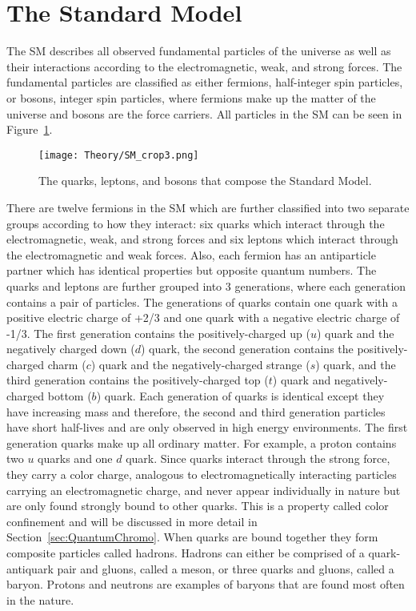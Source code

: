 \section{The Standard Model}

The SM describes all observed fundamental particles of the universe as well as their interactions according to the electromagnetic, weak, and strong forces. The fundamental particles are classified as either fermions, half-integer spin particles, or bosons, integer spin particles, where fermions make up the matter of the universe and bosons are the force carriers. All particles in the SM can be seen in Figure~\ref{fig:StandardModel}\cite{SM}.

\begin{figure}[htbp]
\begin{center}
\texttt{[image: Theory/SM\_crop3.png]}
\end{center}
\caption{The quarks, leptons, and bosons that compose the Standard Model\cite{SM}.}
\label{fig:StandardModel}
\end{figure}

There are twelve fermions in the SM which are further classified into two separate groups according to how they interact: six quarks which interact through the electromagnetic, weak, and strong forces and six leptons which interact through the electromagnetic and weak forces. Also, each fermion has an antiparticle partner which has identical properties but opposite quantum numbers. The quarks and leptons are further grouped into 3 generations, where each generation contains a pair of particles. The generations of quarks contain one quark with a positive electric charge of +2/3 and one quark with a negative electric charge of -1/3. The first generation contains the positively-charged up ($u$) quark and the negatively charged down ($d$) quark, the second generation contains the positively-charged charm ($c$) quark and the negatively-charged strange ($s$) quark, and the third generation contains the positively-charged top ($t$) quark and negatively-charged bottom ($b$) quark. Each generation of quarks is identical except they have increasing mass and therefore, the second and third generation particles have short half-lives and are only observed in high energy environments. The first generation quarks make up all ordinary matter. For example, a proton contains two $u$ quarks and one $d$ quark. Since quarks interact through the strong force, they carry a color charge, analogous to electromagnetically interacting particles carrying an electromagnetic charge, and never appear individually in nature but are only found strongly bound to other quarks. This is a property called color confinement and will be discussed in more detail in Section~\ref{sec:QuantumChromo}. When quarks are bound together they form composite particles called hadrons. Hadrons can either be comprised of a quark-antiquark pair and gluons, called a meson, or three quarks and gluons, called a baryon. Protons and neutrons are examples of baryons that are found most often in the nature. 


